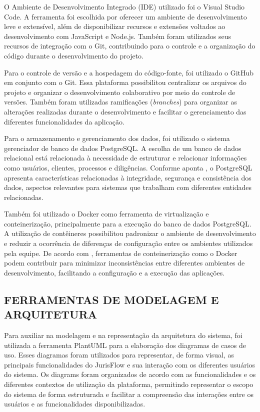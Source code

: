O Ambiente de Desenvolvimento Integrado (IDE) utilizado foi o Visual Studio Code.
A ferramenta foi escolhida por oferecer um ambiente de desenvolvimento leve e
extensível, além de disponibilizar recursos e extensões voltados ao desenvolvimento
com JavaScript e Node.js. Também foram utilizados seus recursos de integração com
o Git, contribuindo para o controle e a organização do código durante o
desenvolvimento do projeto.

Para o controle de versão e a hospedagem do código-fonte, foi utilizado o GitHub em conjunto com o Git. 
Essa plataforma possibilitou centralizar os arquivos do projeto e organizar o desenvolvimento colaborativo 
por meio do controle de versões. Também foram utilizadas ramificações (\textit{branches}) para organizar as 
alterações realizadas durante o desenvolvimento e facilitar o gerenciamento das diferentes funcionalidades da aplicação.

Para o armazenamento e gerenciamento dos dados, foi utilizado o sistema gerenciador
de banco de dados PostgreSQL. A escolha de um banco de dados relacional está
relacionada à necessidade de estruturar e relacionar informações como usuários,
clientes, processos e diligências. Conforme aponta , o
PostgreSQL apresenta características relacionadas à integridade, segurança e
consistência dos dados, aspectos relevantes para sistemas que trabalham com
diferentes entidades relacionadas.

Também foi utilizado o Docker como ferramenta de virtualização e conteinerização,
principalmente para a execução do banco de dados PostgreSQL. A utilização de
contêineres possibilitou padronizar o ambiente de desenvolvimento e reduzir a
ocorrência de diferenças de configuração entre os ambientes utilizados pela equipe.
De acordo com , ferramentas de conteinerização como o Docker podem
contribuir para minimizar inconsistências entre diferentes ambientes de
desenvolvimento, facilitando a configuração e a execução das aplicações.

\subsection{FERRAMENTAS DE MODELAGEM E ARQUITETURA}

Para auxiliar na modelagem e na representação da arquitetura do sistema, foi
utilizada a ferramenta PlantUML para a elaboração dos diagramas de casos de uso.
Esses diagramas foram utilizados para representar, de forma visual, as principais
funcionalidades do JurisFlow e sua interação com os diferentes usuários do sistema.
Os diagrams foram organizados de acordo com as
funcionalidades e os diferentes contextos de utilização da plataforma, permitindo
representar o escopo do sistema de forma estruturada e facilitar a compreensão das
interações entre os usuários e as funcionalidades disponibilizadas.

